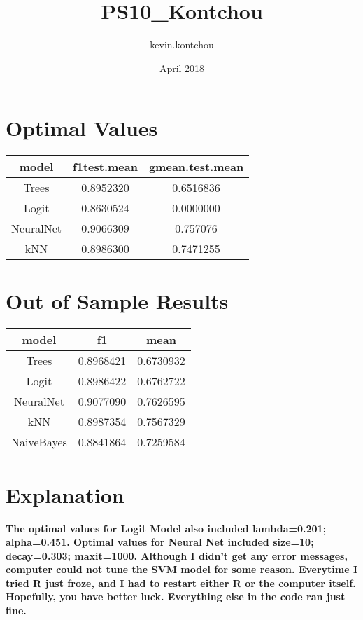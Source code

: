\documentclass{article}
\title{PS10_Kontchou}
\author{kevin.kontchou }
\date{April 2018}
\begin{document}
\maketitle
\section{Optimal Values}
\begin{table}[h!]
\centering
 \begin{tabular}{||c c c||} 
 \hline
 model & f1test.mean & gmean.test.mean \\ [0.5ex] 
 \hline\hline
 Trees & 0.8952320 & 0.6516836 \\ 
 Logit & 0.8630524 & 0.0000000 \\
 NeuralNet & 0.9066309 & 0.757076 \\
 kNN & 0.8986300 & 0.7471255 \\ [1ex] 
 \hline
 \end{tabular}
\end{table}

\section{Out of Sample Results}
\begin{table}[h!]
\centering
 \begin{tabular}{||c c c||} 
 \hline
 model & f1 & mean \\ [0.5ex] 
 \hline\hline
 Trees & 0.8968421 & 0.6730932 \\ 
 Logit & 0.8986422 & 0.6762722 \\
 NeuralNet & 0.9077090 & 0.7626595 \\
 kNN & 0.8987354 & 0.7567329 \\
 NaiveBayes & 0.8841864 & 0.7259584 \\ [1ex] 
 \hline
 \end{tabular}
 \end{table}
 
\section{Explanation}
\textbf{The optimal values for Logit Model also included lambda=0.201; alpha=0.451. Optimal values for Neural Net included size=10; decay=0.303; maxit=1000. Although I didn't get any error messages, computer could not tune the SVM model for some reason. Everytime I tried R just froze, and I had to restart either R or the computer itself. Hopefully, you have better luck. Everything else in the code ran just fine.}
\end{document}
